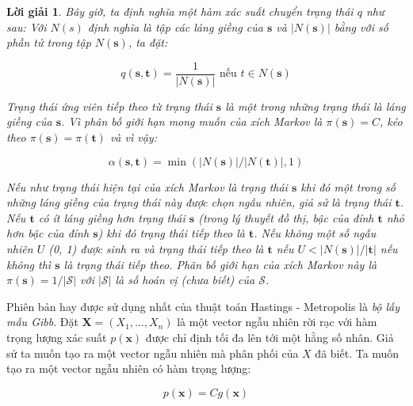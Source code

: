 \documentclass[14pt, a4paper]{article}
\numberwithin{equation}{section}
\numberwithin{figure}{section}
\theoremstyle{sltheorem}
\theoremstyle{soltheorem}
\newtheorem*{loigiai}{Lời giải}
\numberwithin{dl}{section}
\numberwithin{md}{section}
\numberwithin{vd}{section}
\begin{document}
    \begin{loigiai}
        Bây giờ, ta định nghĩa một hàm xác suất chuyển trạng thái $q$ như sau: Với $N(s)$ định nghĩa là tập các láng giềng của $\mathbf{s}$ và $\lvert N (\mathbf{s}) \rvert$ bằng với số phần tử trong tập $N(\mathbf{s})$, ta đặt:
        
        \begin{equation*}
            q(\mathbf{s}, \mathbf{t}) = \dfrac{1}{\lvert N (\mathbf{s}) \rvert} \text{ nếu } t \in N(\mathbf{s})
        \end{equation*}

        Trạng thái ứng viên tiếp theo từ trạng thái $\mathbf{s}$ là một trong những trạng thái là láng giềng của $\mathbf{s}$.
        Vì phân bố giới hạn mong muốn của xích Markov là $\pi (\mathbf{s})=C$, kéo theo $\pi(\mathbf{s})=\pi(\mathbf{t})$ và vì vậy:

        \begin{equation*}
            \alpha (\mathbf{s}, \mathbf{t}) = \min(\lvert N(\mathbf{s}) \vert/ \lvert N (\mathbf{t}) \rvert, 1)
        \end{equation*}

        Nếu như trạng thái hiện tại của xích Markov là trạng thái $\mathbf{s}$ khi đó một trong số những láng giềng của trạng thái này được chọn ngẫu nhiên, giả sử là trạng thái $\mathbf{t}$.
        Nếu $\mathbf{t}$ có ít láng giềng hơn trạng thái $\mathbf{s}$ (trong lý thuyết đồ thị, bậc của đỉnh $\mathbf{t}$ nhỏ hơn bậc của đỉnh $\mathbf{s}$) khi đó trạng thái tiếp theo là $\mathbf{t}$.
        Nếu không một số ngẫu nhiên $U$ (0, 1) được sinh ra và trạng thái tiếp theo là $\mathbf{t}$ nếu $U < \lvert N(\mathbf{s}) \rvert / \lvert \mathbf{t} \rvert$ nếu không thì $\mathbf{s}$ là trạng thái tiếp theo.
        Phân bố giới hạn của xích Markov này là $\pi(\mathbf{s})=1/\lvert \mathscr{S} \rvert$ với $\lvert \mathscr{S} \rvert$ là số hoán vị (chưa biết) của $\mathscr{S}$.

    \end{loigiai}

    Phiên bản hay được sử dụng nhất của thuật toán Hastings - Metropolis là \textit{bộ lấy mẫu Gibb}.
    Đặt $\mathbf{X}=(X_1, \dots, X_n)$ là một vector ngẫu nhiên rời rạc với hàm trọng lượng xác suất $p(\mathbf{x})$ được chỉ định tối đa lên tới một hằng số nhân.
    Giả sử ta muốn tạo ra một vector ngẫu nhiên mà phân phối của $X$ đã biết.
    Ta muốn tạo ra một vector ngẫu nhiên có hàm trọng lượng:

    \begin{equation*}
        p(\mathbf{x}) = C g(\mathbf{x})
    \end{equation*}
\end{document}
